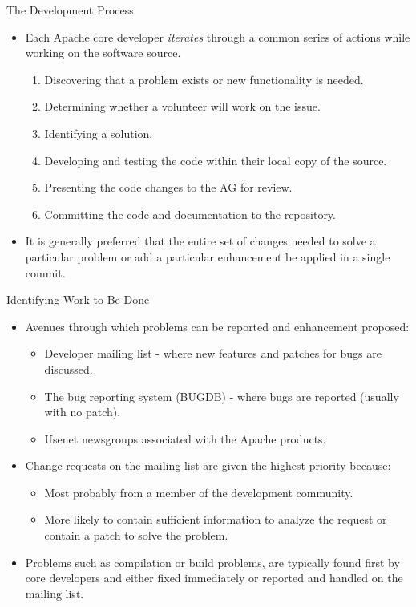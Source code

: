 \documentclass{beamer}
\begin{document}
\begin{frame}{The Development Process}
\begin{itemize}
	\item Each Apache core developer \emph{iterates} through a common series of actions while working on the software source. \pause
	\begin{enumerate}
		\item Discovering that a problem exists or new functionality is needed. \pause	
		\item Determining whether a volunteer will work on the issue. \pause
		\item Identifying a solution. \pause
		\item Developing and testing the code within their local copy of the source. \pause
		\item Presenting the code changes to the AG for review. \pause
		\item Committing the code and documentation to the repository. \pause
	\end{enumerate}
	\item It is generally preferred that the entire set of changes needed to solve a particular problem or add a particular enhancement be applied in a single commit.
\end{itemize}
\end{frame}

\begin{frame}{Identifying Work to Be Done}
\begin{itemize}
	\item Avenues through which problems can be reported and enhancement proposed:\pause
	\begin{itemize}
		\item Developer mailing list - where new features and patches for bugs are discussed.\pause
		\item The bug reporting system (BUGDB) - where bugs are reported (usually with no patch).\pause
		\item Usenet newsgroups associated with the Apache products.\pause
	\end{itemize}
	\item Change requests on the mailing list are given the highest priority because:\pause
	\begin{itemize}
		\item Most probably from a member of the development community.\pause
		\item More likely to contain sufficient information to analyze the request or contain a patch to solve the problem.\pause
	\end{itemize}
	\item Problems such as compilation or build problems, are typically found first by core developers and either fixed immediately or reported and handled on the mailing list. 
\end{itemize}
\end{frame}
\end{document}
